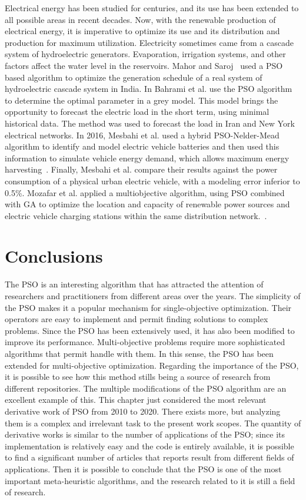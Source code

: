 Electrical energy has been studied for centuries, and its use has been extended to all possible areas in recent decades. Now, with the renewable production of electrical energy, it is imperative to optimize its use and its distribution and production for maximum utilization.
Electricity sometimes came from a cascade system of hydroelectric generators. Evaporation, irrigation systems, and other factors affect the water level in the reservoirs. Mahor and Saroj~\cite{mahor2012short} used a PSO based algorithm to optimize the generation schedule of a real system of hydroelectric cascade system in India.
In \cite{bahrami2014short} Bahrami et al. use the PSO algorithm to determine the optimal parameter in a grey model. This model brings the opportunity to forecast the electric load in the short term, using minimal historical data. The method was used to forecast the load in Iran and New York electrical networks.
In 2016, Mesbahi et al. used a hybrid PSO-Nelder-Mead algorithm to identify and model electric vehicle batteries and then used this information to simulate vehicle energy demand, which allows maximum energy harvesting~\cite{mesbahi2016dynamical}. Finally, Mesbahi et al. compare their results against the power consumption of a physical urban electric vehicle, with a modeling error inferior to 0.5\%.
Mozafar et al. applied a multiobjective algorithm, using PSO combined with GA to optimize the location and capacity of renewable power sources and electric vehicle charging stations within the same distribution network.~\cite{mozafar2017simultaneous}.

\section{Conclusions}
\label{sec:conclusions}

The PSO is an interesting algorithm that has attracted the attention of researchers and practitioners from different areas over the years. The simplicity of the PSO makes it a popular mechanism for single-objective optimization. Their operators are easy to implement and permit finding solutions to complex problems. Since the PSO has been extensively used, it has also been modified to improve its performance.
Multi-objective problems require more sophisticated algorithms that permit handle with them.
In this sense, the PSO has been extended for multi-objective optimization. Regarding the importance of the PSO, it is possible to see how this method stills being a source of research from different repositories. The multiple modifications of the PSO algorithm are an excellent example of this. This chapter just considered the most relevant derivative work of PSO from 2010 to 2020. There exists more, but analyzing them is a complex and irrelevant task to the present work scopes. The quantity of derivative works is similar to the number of applications of the PSO; since its implementation is relatively easy and the code is entirely available, it is possible to find a significant number of articles that reports result from different fields of applications. Then it is possible to conclude that the PSO is one of the most important meta-heuristic algorithms, and the research related to it is still a field of research.

